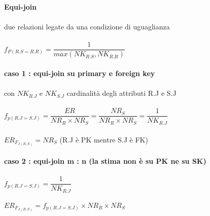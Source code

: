 \documentclass[a4paper,12pt]{article}
\begin{document}
\begin{titlepage}
\begin{titlepage}
		\textbf{Equi-join} \\ \\
		due relazioni legate da una condizione di uguaglianza \\ \\
		$f_{P(R.S = R.R)} = \dfrac{1}{max(NK_{R.S}, NK_{R.R})}$ \\ \\
		\textbf{caso 1 : equi-join su primary e foreign key} \\ \\
		con $NK_{R.J}$ e $NK_{S.J}$  cardinalità degli attributi R.J e S.J  \\ \\
		$f_{p(R.J = S.J)} = \dfrac{ER}{NR_{R} \times NR_{S}} = \dfrac{NR_{S}}{NR_{R} \times NR_{S}} = \dfrac{1}{NK_{R.J}} $ \\ \\
		$ER_{F_{J(R,S)}} = NR_{S}$ (R.J è PK mentre S.J è FK) \\ \\
		\textbf{caso 2 : equi-join m : n (la stima non è su PK ne su SK)} \\ \\
		$f_{p(R.J = S.J)} = \dfrac{1}{NK_{R.J}}$ \\ \\
		$ER_{F_{J(R, S)}} = f_{p(R.J = S.J)} \times NR_{R} \times NR_{S}$
		
		\end{titlepage}
	\end{titlepage}
\end{document}
